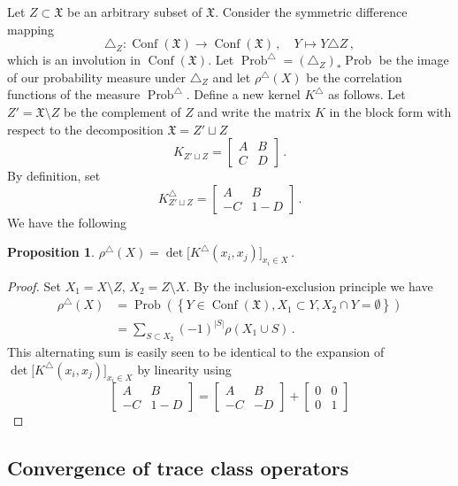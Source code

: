 \documentclass[12pt]{amsart}
\newcommand{\Prob}{\operatorname{Prob}}
\newcommand{\Conf}{\operatorname{Conf}}
\newcommand{\CX}{\Conf(\X)}
\newcommand{\tri}{\triangle}
\newcommand{\trZ}{\tri_Z}
\newcommand{\X}{\mathfrak{X}}
\theoremstyle{plain}
\newtheorem{proposition}[lemma]{Proposition}
\theoremstyle{definition}
\numberwithin{equation}{section}
\begin{document}
Let $Z\subset \X$ be an arbitrary subset of $\X$. Consider the 
symmetric difference mapping
%
\begin{equation*}
\trZ: \CX\to \CX\,,\quad
Y\mapsto Y\tri Z \,,
\end{equation*}
%
which is an involution in $\CX$. Let $\Prob^\tri=\left(\trZ\right)_* \Prob$
be the image of our probability measure under $\trZ$
and let $\rho^\tri(X)$ be the correlation functions of the 
measure $\Prob^\tri$. Define a new kernel $K^\tri$ as follows. Let $Z'=\X\setminus Z$
be the complement of $Z$ and write the matrix $K$ in the block form
with respect to the decomposition $\X=Z'\sqcup Z$
$$
K_{Z'\sqcup Z}=
\begin{bmatrix} A & B \\ C & D 
\end{bmatrix}\,.
$$
By definition, set
$$
K^\tri_{Z'\sqcup Z}=
\begin{bmatrix} A & B \\ -C & 1-D 
\end{bmatrix}\,.
$$
We have the following
%
\begin{proposition}\label{pAc}
 $\rho^\tri(X)=\det\Big[K^\tri(x_i,x_j)\Big]_{x_i\in X}$\,.
\end{proposition}
%
\begin{proof}
Set $X_1=X\setminus Z$, $X_2=Z\setminus X$.
By the inclusion-exclusion principle we have
%
\begin{align*}
\rho^\tri(X)&=\Prob\left(\left\{Y\in\CX, X_1\subset Y, X_2\cap Y=\emptyset
\right\}\right) \\
&=\sum_{S\subset X_2} (-1)^{|S|} \rho(X_1 \cup S)\,.
\end{align*}
%
This alternating sum is easily seen to be identical to
the expansion of $\det\Big[K^\tri(x_i,x_j)\Big]_{x_i\in X}$ by
linearity using 
$$
\begin{bmatrix} A & B \\ -C & 1-D 
\end{bmatrix} = 
\begin{bmatrix} A & B \\ -C & -D 
\end{bmatrix} + \begin{bmatrix} 0 & 0 \\ 0 & 1 
\end{bmatrix}
$$
\end{proof}


\subsection{Convergence of trace class operators}
\end{document}
